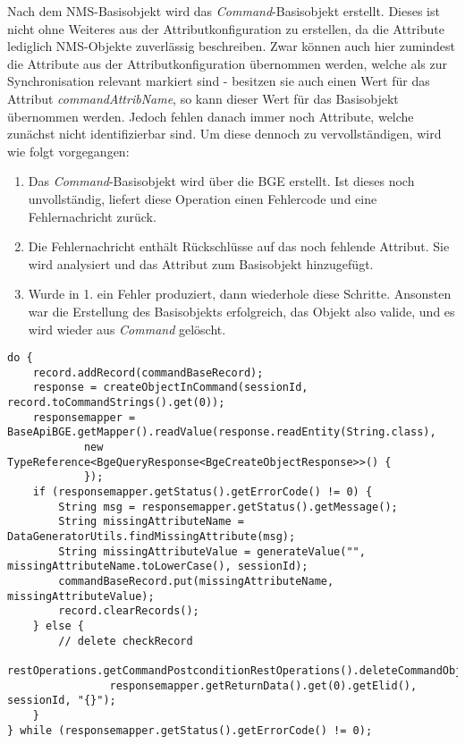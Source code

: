 Nach dem \ac{NMS}-Basisobjekt wird das \textit{Command}-Basisobjekt erstellt. Dieses ist nicht ohne Weiteres aus der Attributkonfiguration zu erstellen, da die Attribute lediglich \ac{NMS}-Objekte zuverlässig beschreiben. Zwar können auch hier zumindest die Attribute aus der Attributkonfiguration übernommen werden, welche als zur Synchronisation relevant markiert sind - besitzen sie auch einen Wert für das Attribut \textit{commandAttribName}, so kann dieser Wert für das Basisobjekt übernommen werden. Jedoch fehlen danach immer noch Attribute, welche zunächst nicht identifizierbar sind. Um diese dennoch zu vervollständigen, wird wie folgt vorgegangen:

\begin{enumerate}
    \item Das \textit{Command}-Basisobjekt wird über die \ac{BGE} erstellt. Ist dieses noch unvollständig, liefert diese Operation einen Fehlercode und eine Fehlernachricht zurück.
    \item Die Fehlernachricht enthält Rückschlüsse auf das noch fehlende Attribut. Sie wird analysiert und das Attribut zum Basisobjekt hinzugefügt.
    \item Wurde in 1. ein Fehler produziert, dann wiederhole diese Schritte. Ansonsten war die Erstellung des Basisobjekts erfolgreich, das Objekt also valide, und es wird wieder aus \textit{Command} gelöscht.
\end{enumerate}

\begin{lstlisting}[caption=Vorgehen zum Vervollständigen des \textit{Command}-Basisobjekts, label=commandBaseRecord,style=Javastyle]
do {
    record.addRecord(commandBaseRecord);
    response = createObjectInCommand(sessionId, record.toCommandStrings().get(0));
    responsemapper = BaseApiBGE.getMapper().readValue(response.readEntity(String.class),
            new TypeReference<BgeQueryResponse<BgeCreateObjectResponse>>() {
            });
    if (responsemapper.getStatus().getErrorCode() != 0) {
        String msg = responsemapper.getStatus().getMessage();
        String missingAttributeName = DataGeneratorUtils.findMissingAttribute(msg);
        String missingAttributeValue = generateValue("", missingAttributeName.toLowerCase(), sessionId);
        commandBaseRecord.put(missingAttributeName, missingAttributeValue);
        record.clearRecords();
    } else {
        // delete checkRecord
        restOperations.getCommandPostconditionRestOperations().deleteCommandObject(this.entityId,
                responsemapper.getReturnData().get(0).getElid(), sessionId, "{}");
    }
} while (responsemapper.getStatus().getErrorCode() != 0);
\end{lstlisting}

